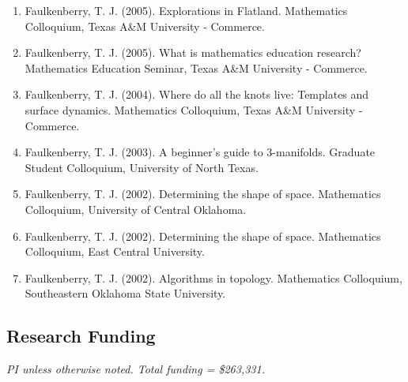 \documentclass[article,10pt]{article}
\begin{document}
\begin{enumerate}
\item Faulkenberry, T. J. (2005). Explorations in Flatland. Mathematics Colloquium, Texas A\&M University - Commerce.
\item Faulkenberry, T. J. (2005). What is mathematics education research? Mathematics Education Seminar, Texas A\&M University - Commerce.
\item Faulkenberry, T. J. (2004). Where do all the knots live: Templates and surface dynamics. Mathematics Colloquium, Texas A\&M University - Commerce.
\item Faulkenberry, T. J. (2003). A beginner’s guide to 3-manifolds. Graduate Student Colloquium, University of North Texas.
\item Faulkenberry, T. J. (2002). Determining the shape of space. Mathematics Colloquium, University of Central Oklahoma.
\item Faulkenberry, T. J. (2002). Determining the shape of space. Mathematics Colloquium, East Central University.
\item Faulkenberry, T. J. (2002). Algorithms in topology. Mathematics Colloquium, Southeastern Oklahoma State University.
\end{enumerate}

\subsection*{Research Funding}
\label{sec:org6dbbc8f}

\emph{PI unless otherwise noted.  Total funding = \$263,331.}
\end{document}
